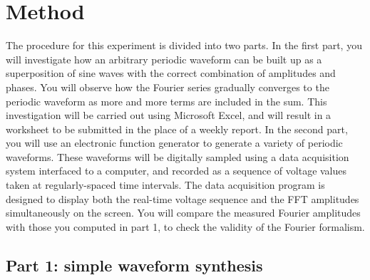 \documentclass{revtex4}
\begin{document}

\section{Method}

The procedure for this experiment is divided into two parts.  In the first
part, you will investigate how an arbitrary periodic waveform can be built
up as a superposition of sine waves with the correct combination of amplitudes
and phases.  You will observe how the Fourier series gradually converges to
the periodic waveform as more and more terms are included in the sum.
This investigation will be carried out using Microsoft Excel, and will
result in a worksheet to be submitted in the place of a weekly report.  In
the second part, you will use an electronic function generator to generate
a variety of periodic waveforms.  These waveforms will be digitally sampled
using a data acquisition system interfaced to a computer, and recorded as
a sequence of voltage values taken at regularly-spaced time intervals.
The data acquisition program is designed to display both the real-time
voltage sequence and the FFT amplitudes simultaneously on the screen.  You
will compare the measured Fourier amplitudes with those you computed in part
1, to check the validity of the Fourier formalism.

\subsection{Part 1: simple waveform synthesis}
\end{document}
